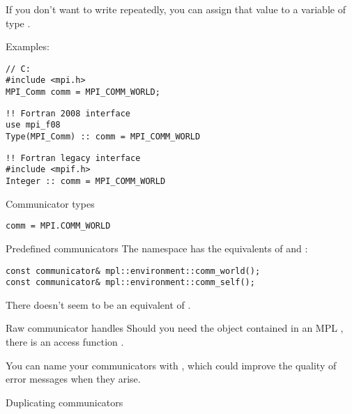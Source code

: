 If you don't want to write  repeatedly, you can
assign that value to a variable of type .

Examples:
\lstset{language=C}
\begin{lstlisting}
// C:
#include <mpi.h>
MPI_Comm comm = MPI_COMM_WORLD;
\end{lstlisting}

\lstset{language=Fortran}
\begin{lstlisting}
!! Fortran 2008 interface
use mpi_f08
Type(MPI_Comm) :: comm = MPI_COMM_WORLD
\end{lstlisting}

\begin{lstlisting}
!! Fortran legacy interface
#include <mpif.h>
Integer :: comm = MPI_COMM_WORLD
\end{lstlisting}
\lstset{language=C}

\begin{pythonnote}{Communicator types}
\lstset{language=python}
\begin{lstlisting}
comm = MPI.COMM_WORLD
\end{lstlisting}
\end{pythonnote}

\begin{mplnote}{Predefined communicators}
  The  namespace has the equivalents
  of  and :
\begin{lstlisting}
const communicator& mpl::environment::comm_world();
const communicator& mpl::environment::comm_self();    
\end{lstlisting}
There doesn't seem to be an equivalent of .
\end{mplnote}

\begin{mplnote}{Raw communicator handles}
  Should you need the  object
  contained in an MPL ,
  there is an access function .
\end{mplnote}

You can name your communicators with , which
could improve the quality of error messages when they arise.

 {Duplicating communicators}
\label{sec:comm-dup}



